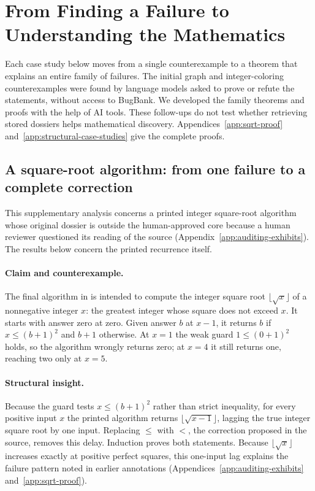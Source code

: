 \section{From Finding a Failure to Understanding the Mathematics}
\label{sec:mathematics}
\label{sec:mathematical-results}
Each case study below moves from a single counterexample to a theorem that explains an entire family of failures. The initial graph and integer-coloring counterexamples were found by language models asked to prove or refute the statements, without access to BugBank. We developed the family theorems and proofs with the help of AI tools. These follow-ups do not test whether retrieving stored dossiers helps mathematical discovery. Appendices~\ref{app:sqrt-proof} and~\ref{app:structural-case-studies} give the complete proofs.

\subsection{A square-root algorithm: from one failure to a complete correction}
This supplementary analysis concerns a printed integer square-root algorithm whose original dossier is outside the human-approved core because a human reviewer questioned its reading of the source (Appendix~\ref{app:auditing-exhibits}). The results below concern the printed recurrence itself.

\paragraph{Claim and counterexample.}
The final algorithm in  is intended to compute the integer square root $\lfloor\sqrt{x}\rfloor$ of a nonnegative integer $x$: the greatest integer whose square does not exceed $x$. It starts with answer zero at zero. Given answer $b$ at $x-1$, it returns $b$ if $x\le(b+1)^2$ and $b+1$ otherwise. At $x=1$ the weak guard $1\le(0+1)^2$ holds, so the algorithm wrongly returns zero; at $x=4$ it still returns one, reaching two only at $x=5$.

\paragraph{Structural insight.}
Because the guard tests $x\le(b+1)^2$ rather than strict inequality, for every positive input $x$ the printed algorithm returns $\lfloor\sqrt{x-1}\rfloor$, lagging the true integer square root by one input. Replacing $\le$ with $<$, the correction proposed in the source, removes this delay. Induction proves both statements. Because $\lfloor\sqrt{x}\rfloor$ increases exactly at positive perfect squares, this one-input lag explains the failure pattern noted in earlier annotations (Appendices~\ref{app:auditing-exhibits} and~\ref{app:sqrt-proof}).

